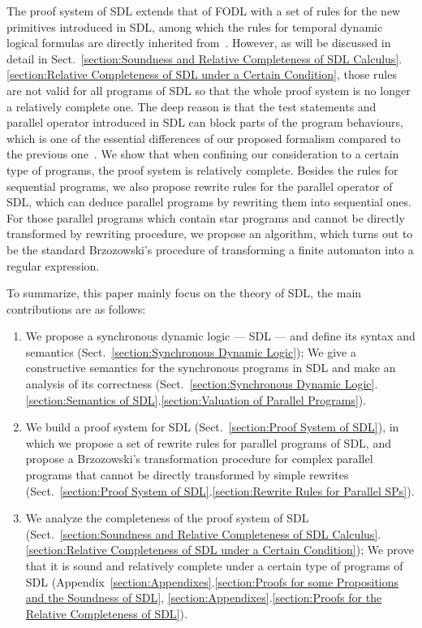 \documentclass{fcs}
\begin{document}
The proof system of SDL extends that of FODL with a set of rules for the new primitives introduced in SDL, among which the rules for temporal dynamic logical formulas are directly inherited from~\cite{Beckert01,Platzer07}.
However, as will be discussed in detail in Sect.~\ref{section:Soundness and Relative Completeness of SDL Calculus}.\ref{section:Relative Completeness of SDL under a Certain Condition}, those rules are not valid for all programs of SDL so that the whole proof system is no longer a relatively complete one.
The deep reason is that the test statements and parallel operator introduced in SDL can block parts of the program behaviours, which is one of the essential differences of our proposed formalism compared to the previous one~\cite{Beckert01}.
We show that when confining our consideration to a certain type of programs, the proof system is relatively complete.
Besides the rules for sequential programs,
we also propose rewrite rules for the parallel operator of SDL, which can deduce parallel programs by rewriting them into sequential ones.
For those parallel programs which contain star programs and cannot be directly transformed by rewriting procedure, we propose an algorithm, which turns out to be the standard Brzozowski's procedure of transforming a finite automaton into a regular expression.


To summarize, this paper mainly focus on the theory of SDL, the main contributions are as follows:
\begin{enumerate}
\item We propose a synchronous dynamic logic --- SDL --- and define its syntax and semantics (Sect.~\ref{section:Synchronous Dynamic Logic}); We give a constructive semantics for the synchronous programs in SDL and make an analysis of its correctness (Sect.~\ref{section:Synchronous Dynamic Logic}.\ref{section:Semantics of SDL}.\ref{section:Valuation of Parallel Programs}).
\item We build a proof system for SDL (Sect.~\ref{section:Proof System of SDL}), in which we propose a set of rewrite rules for parallel programs of SDL, and propose a Brzozowski's transformation procedure for complex parallel programs that cannot be directly transformed by simple rewrites (Sect.~\ref{section:Proof System of SDL}.\ref{section:Rewrite Rules for Parallel SPs}).
\item We analyze the completeness of the proof system of SDL (Sect.~\ref{section:Soundness and Relative Completeness of SDL Calculus}.\ref{section:Relative Completeness of SDL under a Certain Condition}); We prove that it is sound and relatively complete under a certain type of programs of SDL (Appendix~\ref{section:Appendixes}.\ref{section:Proofs for some Propositions and the Soundness of SDL}, \ref{section:Appendixes}.\ref{section:Proofs for the Relative Completeness of SDL}).
\end{enumerate}
\end{document}

